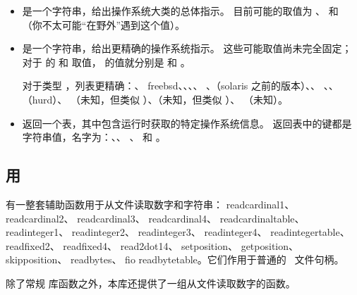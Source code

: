 \begin{itemize}
\item {} 是一个字符串，给出操作系统大类的总体指示。
    目前可能的取值为 、 和 
    （你不太可能“在野外”遇到这个值）。

\item {} 是一个字符串，给出更精确的操作系统指示。
    这些可能取值尚未完全固定；对于  的  和
     取值， 的值就分别是  和
    。

    对于类型 ，列表更精确：、\type
    {freebsd}、、、、
    、（solaris 之前的版本）、、
    、、（hurd）、
    （未知，但类似 \BSD）、（未知，但类似 \SYSV）、
    （未知）。

\item {} 返回一个表，其中包含运行时获取的特定操作系统信息。
    返回表中的键都是字符串值，名字为：、、
    、 和 。

\end{itemize}

\subsection{用 }

有一整套辅助函数用于从文件读取数字和字符串：
 {readcardinal1}、 {readcardinal2}、
{readcardinal3}、 {readcardinal4}、
{readcardinaltable}、 {readinteger1}、 {readinteger2}、
 {readinteger3}、 {readinteger4}、
{readintegertable}、 {readfixed2}、 {readfixed4}、
 {read2dot14}、 {setposition}、
{getposition}、 {skipposition}、 {readbytes}、\libidx
{fio} {readbytetable}。它们作用于普通的 \LUA\ 文件句柄。


除了常规  库函数之外，本库还提供了一组从文件读取数字的函数。


